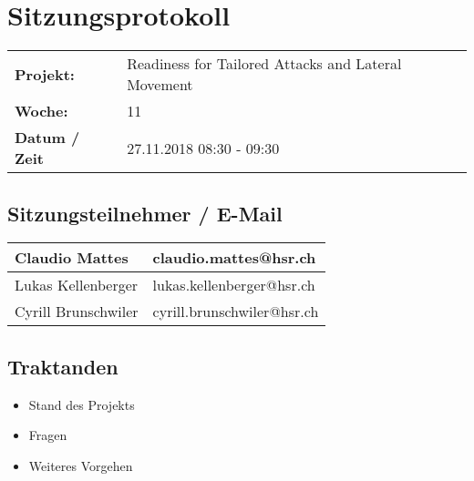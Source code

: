 \newcommand{\TITLE}{Readiness for Tailored Attacks and Lateral Movement Detection}
\newcommand{\REVIEW}{Weekly Meeting}
\newcommand{\VERSION}{0.0}





\section*{Sitzungsprotokoll}

\begin{tabular}{p{4cm} p{12cm}}
    \textbf{Projekt:} & Readiness for Tailored Attacks and Lateral Movement  \\
    \textbf{Woche:} & 11 \\
    \textbf{Datum / Zeit} & 27.11.2018 08:30 - 09:30 \\
\end{tabular}

\subsection*{Sitzungsteilnehmer / E-Mail}
\begin{table}[H]
    \centering
    \begin{tabular}{p{4cm} p{12cm}} \hline
        Claudio Mattes & claudio.mattes@hsr.ch \\ \hline
        Lukas Kellenberger & lukas.kellenberger@hsr.ch \\ \hline
        Cyrill Brunschwiler & cyrill.brunschwiler@hsr.ch \\ \hline
    \end{tabular}
\end{table}

\vspace{1cm}

\subsection*{Traktanden}
\begin{itemize}
    \item Stand des Projekts
    \item Fragen
    \item Weiteres Vorgehen
\end{itemize}

\clearpage


